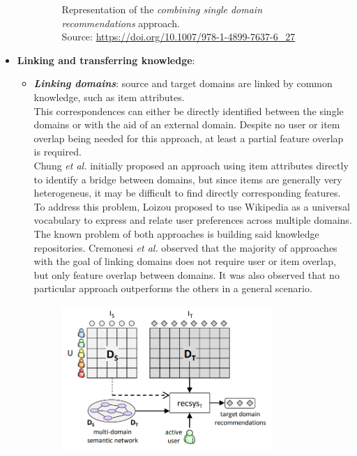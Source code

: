 \begin{itemize}
\begin{itemize}
\begin{figure}[hbt]
\caption{Representation of the \textit{combining single domain recommendations} approach.\\
Source: \url{https://doi.org/10.1007/978-1-4899-7637-6\_27}}
\end{figure}
\end{itemize}
\item \textbf{Linking and transferring knowledge}:
\begin{itemize}
\item \textbf{\textit{Linking domains}}: source and target domains are linked by common knowledge, such as item attributes.\\
This correspondences can either be directly identified between the single domains or with the aid of an external domain. Despite no user or item overlap being needed for this approach, at least a partial feature overlap is required.\\
Chung \textit{et al.} \cite{10.1145/1282100.1282113} initially proposed an approach using item attributes directly to identify a bridge between domains, but since items are generally very heterogeneus, it may be difficult to find directly corresponding features. To address this problem, Loizou \cite{crossdomain-recsys-categorization} proposed to use Wikipedia as a universal vocabulary to express and relate user preferences across multiple domains.\\
The known problem of both approaches is building said knowledge repositories. Cremonesi \textit{et al.} \cite{10.1007/978-1-4899-7637-6_27} observed that the majority of approaches with the goal of linking domains does not require user or item overlap, but only feature overlap between domains. It was also observed that no particular approach outperforms the others in a general scenario.
\begin{figure}[hbt]
\centering
\includegraphics[width=0.8\textwidth]{pictures/linking-domains}

\end{figure}
\end{itemize}
\end{itemize}
